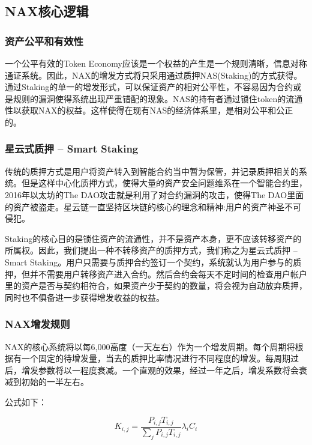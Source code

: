 \subsection{NAX核心逻辑}

\subsubsection{资产公平和有效性}

一个公平有效的Token Economy应该是一个权益的产生是一个规则清晰，信息对称通证系统。因此，NAX的增发方式将只采用通过质押NAS(Staking)的方式获得。通过Staking的单一的增发形式，可以保证资产的相对公平性，不容易因为合约或是规则的漏洞使得系统出现严重错配的现象。NAS的持有者通过锁住token的流通性以获取NAX的权益。这样使得在现有NAS的经济体系里，是相对公平和公正的。

\subsubsection{星云式质押 -- Smart Staking}
传统的质押方式是用户将资产转入到智能合约当中暂为保管，并记录质押相关的系统。但是这样中心化质押方式，使得大量的资产安全问题维系在一个智能合约里，2016年以太坊的The DAO攻击就是利用了对合约漏洞的攻击，使得The DAO里面的资产被盗走。星云链一直坚持区块链的核心的理念和精神:用户的资产神圣不可侵犯。

Staking的核心目的是锁住资产的流通性，并不是资产本身，更不应该转移资产的所属权。因此，我们提出一种不转移资产的质押方式，我们称之为星云式质押 -- Smart Staking。用户只需要与质押合约签订一个契约，系统就认为用户参与的质押，但并不需要用户转移资产进入合约。然后合约会每天不定时间的检查用户帐户里的资产是否与契约相符合，如果资产少于契约的数量，将会视为自动放弃质押，同时也不俱备进一步获得增发收益的权益。

\subsubsection{NAX增发规则}
NAX的核心系统将以每6,000高度（一天左右）作为一个增发周期。每个周期将根据有一个固定的待增发量，当去的质押比率情况进行不同程度的增发。每周期过后，增发参数将以一程度衰减。一个直观的效果，经过一年之后，增发系数将会衰减到初始的一半左右。

公式如下：

\begin{equation}
  K_{i,j} = \frac{P_{i,j} T_{i,j}}{\sum_j P_{i,j} T_{i,j}} \lambda_i C_i
\end{equation}


